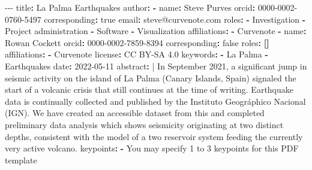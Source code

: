 \documentclass[
  letterpaper,
  DIV=11,
  numbers=noendperiod]{scrartcl}
\newenvironment{Shaded}{\begin{snugshade}}{\end{snugshade}}
\newcommand{\AttributeTok}[1]{\textcolor[rgb]{0.40,0.45,0.13}{#1}}
\newcommand{\CharTok}[1]{\textcolor[rgb]{0.13,0.47,0.30}{#1}}
\newcommand{\FunctionTok}[1]{\textcolor[rgb]{0.28,0.35,0.67}{#1}}
\newcommand{\KeywordTok}[1]{\textcolor[rgb]{0.00,0.23,0.31}{\textbf{#1}}}
\newcommand{\NormalTok}[1]{\textcolor[rgb]{0.00,0.23,0.31}{#1}}
\newcommand{\PreprocessorTok}[1]{\textcolor[rgb]{0.68,0.00,0.00}{#1}}
\newcommand{\StringTok}[1]{\textcolor[rgb]{0.13,0.47,0.30}{#1}}
\begin{document}
\begin{Shaded}
\begin{Highlighting}[]
\PreprocessorTok{{-}{-}{-}}
\FunctionTok{title}\KeywordTok{:}\AttributeTok{ La Palma Earthquakes}
\FunctionTok{author}\KeywordTok{:}
\AttributeTok{  }\KeywordTok{{-}}\AttributeTok{ }\FunctionTok{name}\KeywordTok{:}\AttributeTok{ Steve Purves}
\AttributeTok{    }\FunctionTok{orcid}\KeywordTok{:}\AttributeTok{ 0000{-}0002{-}0760{-}5497}
\AttributeTok{    }\FunctionTok{corresponding}\KeywordTok{:}\AttributeTok{ }\CharTok{true}
\AttributeTok{    }\FunctionTok{email}\KeywordTok{:}\AttributeTok{ steve@curvenote.com}
\AttributeTok{    }\FunctionTok{roles}\KeywordTok{:}
\AttributeTok{      }\KeywordTok{{-}}\AttributeTok{ Investigation}
\AttributeTok{      }\KeywordTok{{-}}\AttributeTok{ Project administration}
\AttributeTok{      }\KeywordTok{{-}}\AttributeTok{ Software}
\AttributeTok{      }\KeywordTok{{-}}\AttributeTok{ Visualization}
\AttributeTok{    }\FunctionTok{affiliations}\KeywordTok{:}
\AttributeTok{      }\KeywordTok{{-}}\AttributeTok{ Curvenote}
\AttributeTok{  }\KeywordTok{{-}}\AttributeTok{ }\FunctionTok{name}\KeywordTok{:}\AttributeTok{ Rowan Cockett}
\AttributeTok{    }\FunctionTok{orcid}\KeywordTok{:}\AttributeTok{ 0000{-}0002{-}7859{-}8394}
\AttributeTok{    }\FunctionTok{corresponding}\KeywordTok{:}\AttributeTok{ }\CharTok{false}
\AttributeTok{    }\FunctionTok{roles}\KeywordTok{:}\AttributeTok{ }\KeywordTok{[]}
\AttributeTok{    }\FunctionTok{affiliations}\KeywordTok{:}
\AttributeTok{      }\KeywordTok{{-}}\AttributeTok{ Curvenote}
\FunctionTok{license}\KeywordTok{:}\AttributeTok{ CC BY{-}SA 4.0}
\FunctionTok{keywords}\KeywordTok{:}
\AttributeTok{  }\KeywordTok{{-}}\AttributeTok{ La Palma}
\AttributeTok{  }\KeywordTok{{-}}\AttributeTok{ Earthquakes}
\FunctionTok{date}\KeywordTok{:}\AttributeTok{ }\StringTok{\textquotesingle{}2022{-}05{-}11\textquotesingle{}}
\FunctionTok{abstract}\KeywordTok{: }\CharTok{|}
\NormalTok{  In September 2021, a significant jump in seismic activity on the island of La Palma (Canary Islands, Spain) signaled the start of a volcanic crisis that still continues at the time of writing. Earthquake data is continually collected and published by the Instituto Geográphico Nacional (IGN). We have created an accessible dataset from this and completed preliminary data analysis which shows seismicity originating at two distinct depths, consistent with the model of a two reservoir system feeding the currently very active volcano.}
\FunctionTok{keypoints}\KeywordTok{:}
\AttributeTok{  }\KeywordTok{{-}}\AttributeTok{ You may specify 1 to 3 keypoints for this PDF template}

\end{Highlighting}
\end{Shaded}
\end{document}
